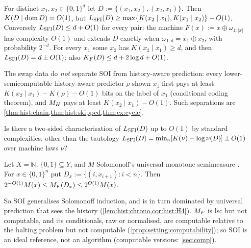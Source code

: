 \begin{example}\label{ex:setting:swap}
For distinct $x_1,x_2\in\{0,1\}^d$ let $D:=\{(x_1,x_2),(x_2,x_1)\}$. Then $K(D\mid\operatorname{dom} D)=O(1)$, but $L_{\mathrm{SFI}}(D)\ge\max\{K(x_2\mid x_1),K(x_1\mid x_2)\}-O(1)$. Conversely $L_{\mathrm{SFI}}(D)\le d+O(1)$ for every pair: the machine $F(x):=x\oplus\omega_{1:|x|}$ has complexity $O(1)$ and extends $D$ exactly when $\omega_{1:d}=x_1\oplus x_2$, with probability $2^{-d}$. For every $x_1$ some $x_2$ has $K(x_2\mid x_1)\ge d$, and then $L_{\mathrm{SFI}}(D)=d\pm O(1)$; also $K_{F}(D)\le d+2\log d+O(1)$.
\end{example}

The swap data do \emph{not} separate SOI from history-aware prediction: every lower-semicomputable history-aware predictor $\rho$ shown $x_1$ first pays at least $K(x_2\mid x_1)-K(\rho)-O(1)$ bits on the label of $x_1$ (conditional coding theorem), and $M_{H}$ pays at least $K(x_2\mid x_1)-O(1)$. Such separations are \cref{thm:hist:chain,thm:hist:skipped,thm:ex:cycle}.

\begin{question}\label{q:setting:twosided}
Is there a two-sided characterisation of $L_{\mathrm{SFI}}(D)$ up to $O(1)$ by standard complexities, other than the tautology $L_{\mathrm{SFI}}(D)=\min_\nu[K(\nu)-\log\nu(D)]\pm O(1)$ over machine laws $\nu$?
\end{question}

\begin{proposition}\label{prop:setting:si}
Let $X=\mathbb N$, $\{0,1\}\subseteq Y$, and $M$ Solomonoff's universal monotone semimeasure \citep{zvonkin1970complexity}. For $x\in\{0,1\}^n$ put $D_x:=\{(i,x_{i+1}):i<n\}$. Then $2^{-O(1)}M(x)\le M_{F}(D_x)\le2^{O(1)}M(x)$.
\end{proposition}

So SOI generalises Solomonoff induction, and is in turn dominated by universal prediction that sees the history (\cref{lem:hist:chrono,cor:hist:H4}). $M_{F}$ is lsc but not computable, and its conditionals, raw or normalised, are computable relative to the halting problem but not computable (\cref{prop:setting:computability}); so SOI is an ideal reference, not an algorithm (computable versions: \cref{sec:comp}).

